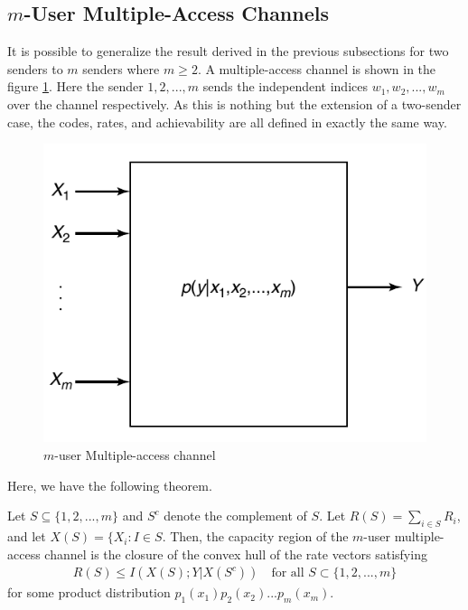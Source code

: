\subsection{$m$-User Multiple-Access Channels}
It is possible to generalize the result derived in the previous subsections for two senders to $m$ senders where $m\geq 2$. A multiple-access channel is shown in the figure \ref{fig:m-MAC}. Here the sender $1,2,...,m$ sends the independent indices $w_1,w_2,...,w_m$ over the channel respectively. As this is nothing but the extension of a two-sender case, the codes, rates, and achievability are all defined in exactly the same way.\\
%
\begin{figure}[h]
    \centering
    \includegraphics[scale=0.30]{Diagrams/M-user MAC.png}
    \caption{$m$-user Multiple-access channel}
    \label{fig:m-MAC}
\end{figure}
%
\linebreak Here, we have the following theorem.
%
\begin{tcolorbox}[boxrule=0pt,frame hidden,sharp corners,enhanced, opacityback=0, borderline west={2pt}{0pt}{blue}]
\begin{thm} 
Let $S \subseteq \{1,2,...,m\}$ and $S^c$ denote the complement of $S$. Let $R(S)=\sum_{i \in S} R_i$, and let $X(S)=\{X_i: I \in S$. Then, the capacity region of the $m$-user multiple-access channel is the closure of the convex hull of the rate vectors satisfying
%
\begin{eqnarray}
    R(S) \leq I(X(S);Y|X(S^c)) \quad \text{for all } S \subset \{1,2,...,m\}
\end{eqnarray}
%
for some product distribution $p_1(x_1)p_2(x_2)...p_m(x_m)$.
\end{thm}
\end{tcolorbox}
%